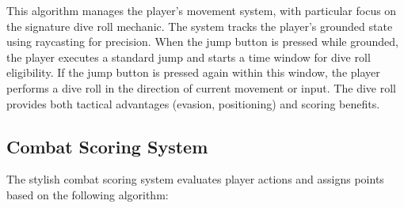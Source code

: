 \documentclass{article}
\begin{document}
    This algorithm manages the player's movement system, with particular focus on the signature dive roll mechanic. The system tracks the player's grounded state using raycasting for precision. When the jump button is pressed while grounded, the player executes a standard jump and starts a time window for dive roll eligibility. If the jump button is pressed again within this window, the player performs a dive roll in the direction of current movement or input. The dive roll provides both tactical advantages (evasion, positioning) and scoring benefits.

    \newpage

    \subsection{Combat Scoring System}
    \label{appendix:scoring}

    The stylish combat scoring system evaluates player actions and assigns points based on the following algorithm:
\end{document}
